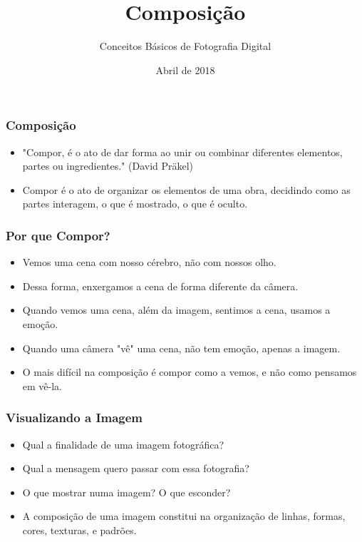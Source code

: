 


\subtitle{Conceitos Básicos de Fotografia Digital}
\title{Composição}
\author{}
\date{Abril de 2018}



\coverframe

\begin{frame}
    \frametitle{Composição}
    \begin{itemize}
      \item "Compor, é o ato de dar forma ao unir ou combinar diferentes elementos,
      partes ou ingredientes." (David Präkel)
      \item Compor é o ato de organizar os elementos de uma obra, decidindo como
      as partes interagem, o que é mostrado, o que é oculto.
    \end{itemize}
\end{frame}

\begin{frame}
    \frametitle{Por que Compor?}
    \begin{itemize}
      \item Vemos uma cena com nosso cérebro, não com nossos olho.
      \item Dessa forma, enxergamos a cena de forma diferente da câmera.
      \item Quando vemos uma cena, além da imagem, sentimos a cena, usamos a emoção.
      \item Quando uma câmera "vê" uma cena, não tem emoção, apenas a imagem.
      \item O mais difícil na composição é compor como a vemos, e não como pensamos em vê-la.
    \end{itemize}
\end{frame}

\begin{frame}
    \frametitle{Visualizando a Imagem}
    \begin{itemize}
      \item Qual a finalidade de uma imagem fotográfica?
      \item Qual a mensagem quero passar com essa fotografia?
      \item O que mostrar numa imagem? O que esconder?
      \item A composição de uma imagem constitui na organização de linhas, formas,
      cores, texturas, e padrões.
    \end{itemize}
\end{frame}

